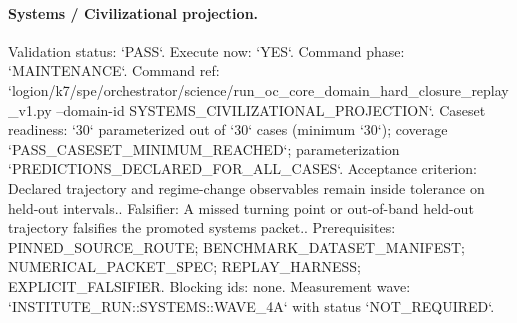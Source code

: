 \paragraph{Systems / Civilizational projection.}
Validation status: `PASS`. Execute now: `YES`. Command phase: `MAINTENANCE`.
Command ref: `logion/k7/spe/orchestrator/science/run\_oc\_core\_domain\_hard\_closure\_replay\_v1.py --domain-id SYSTEMS\_CIVILIZATIONAL\_PROJECTION`.
Caseset readiness: `30` parameterized out of `30` cases (minimum `30`); coverage `PASS\_CASESET\_MINIMUM\_REACHED`; parameterization `PREDICTIONS\_DECLARED\_FOR\_ALL\_CASES`.
Acceptance criterion: Declared trajectory and regime-change observables remain inside tolerance on held-out intervals..
Falsifier: A missed turning point or out-of-band held-out trajectory falsifies the promoted systems packet..
Prerequisites: PINNED\_SOURCE\_ROUTE; BENCHMARK\_DATASET\_MANIFEST; NUMERICAL\_PACKET\_SPEC; REPLAY\_HARNESS; EXPLICIT\_FALSIFIER.
Blocking ids: none.
Measurement wave: `INSTITUTE\_RUN::SYSTEMS::WAVE\_4A` with status `NOT\_REQUIRED`.
